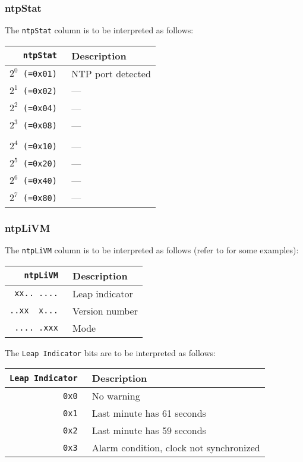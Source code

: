 \documentclass[documentation]{subfiles}
\begin{document}
\clearpage

\subsubsection{ntpStat}\label{ntpStat}
The {\tt ntpStat} column is to be interpreted as follows:
\begin{longtable}{>{\tt}rl}
    \toprule
    {\bf ntpStat} & {\bf Description}\\
    \midrule\endhead%
    $2^0$ (=0x01) & NTP port detected \\
    $2^1$ (=0x02) & --- \\
    $2^2$ (=0x04) & --- \\
    $2^3$ (=0x08) & --- \\
    \\
    $2^4$ (=0x10) & --- \\
    $2^5$ (=0x20) & --- \\
    $2^6$ (=0x40) & --- \\
    $2^7$ (=0x80) & --- \\
    \bottomrule
\end{longtable}

\subsubsection{ntpLiVM}\label{ntpLiVM}
The {\tt ntpLiVM} column is to be interpreted as follows (refer to  for some examples):
\begin{longtable}{>{\tt}rl}
    \toprule
    {\bf ntpLiVM} & {\bf Description}\\
    \midrule\endhead%
    xx.. ....  & Leap indicator\\
    ..xx~ x... & Version number\\ %
    .... .xxx  & Mode\\
    \bottomrule
\end{longtable}

The {\tt Leap Indicator} bits are to be interpreted as follows:
\begin{longtable}{>{\tt}rl}
    \toprule
    {\bf Leap Indicator} & {\bf Description}\\
    \midrule\endhead%
    0x0 & No warning\\
    0x1 & Last minute has 61 seconds\\
    0x2 & Last minute has 59 seconds\\
    0x3 & Alarm condition, clock not synchronized\\
    \bottomrule
\end{longtable}
\end{document}
